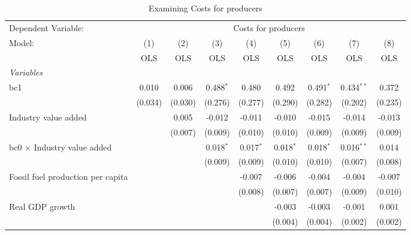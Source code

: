 
\begin{table}[htbp]
   \caption{Examining Costs for producers}
   \centering
   \begin{tabular}{lcccccccc}
      \toprule
      Dependent Variable: & \multicolumn{8}{c}{Costs for producers}\\
      Model:                                  & (1)     & (2)     & (3)         & (4)         & (5)         & (6)         & (7)          & (8)\\  
                                              &  OLS    & OLS     & OLS         & OLS         & OLS         & OLS         & OLS          & OLS\\  
      \midrule
      \emph{Variables}\\
      bc1                                     & 0.010   & 0.006   & 0.488$^{*}$ & 0.480       & 0.492       & 0.491$^{*}$ & 0.434$^{**}$ & 0.372\\   
                                              & (0.034) & (0.030) & (0.276)     & (0.277)     & (0.290)     & (0.282)     & (0.202)      & (0.235)\\   
      Industry value added                    &         & 0.005   & -0.012      & -0.011      & -0.010      & -0.015      & -0.014       & -0.013\\   
                                              &         & (0.007) & (0.009)     & (0.010)     & (0.010)     & (0.009)     & (0.009)      & (0.009)\\   
      bc0 $\times$ Industry value added       &         &         & 0.018$^{*}$ & 0.017$^{*}$ & 0.018$^{*}$ & 0.018$^{*}$ & 0.016$^{**}$ & 0.014\\   
                                              &         &         & (0.009)     & (0.009)     & (0.010)     & (0.010)     & (0.007)      & (0.008)\\   
      Fossil fuel production per capita       &         &         &             & -0.007      & -0.006      & -0.004      & -0.004       & -0.007\\   
                                              &         &         &             & (0.008)     & (0.007)     & (0.007)     & (0.009)      & (0.010)\\   
      Real GDP growth                         &         &         &             &             & -0.003      & -0.003      & -0.001       & 0.001\\   
                                              &         &         &             &             & (0.004)     & (0.004)     & (0.002)      & (0.002)\\   

\end{tabular}
\end{table}
